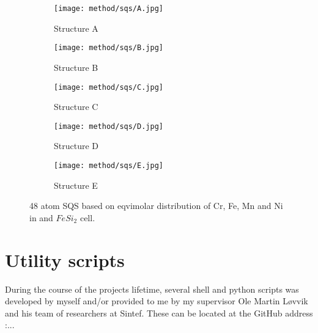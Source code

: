\begin{figure}
\begin{subfigure}{0.5\textwidth}
\texttt{[image: method/sqs/A.jpg]}
\caption{Structure A}
\end{subfigure}
\hfill
\begin{subfigure}{0.5\textwidth}
\texttt{[image: method/sqs/B.jpg]}
\caption{Structure B}
\end{subfigure}
\begin{subfigure}{0.5\textwidth}
\texttt{[image: method/sqs/C.jpg]}
\caption{Structure C}
\end{subfigure}
\hfill
\begin{subfigure}{0.5\textwidth}
\texttt{[image: method/sqs/D.jpg]}
\caption{Structure D}
\end{subfigure}
\begin{subfigure}{0.5\textwidth}
\texttt{[image: method/sqs/E.jpg]}
\caption{Structure E}
\end{subfigure}
\caption{48 atom SQS based on eqvimolar distribution of Cr, Fe, Mn and Ni in and $FeSi_2$ cell.}
\label{sqs_FeSi2}
\end{figure}

\section{Utility scripts}
During the course of the projects lifetime, several shell and python scripts was developed by myself and/or provided to me by my supervisor Ole Martin Løvvik and his team of researchers at Sintef. These can be located at the GitHub address :...